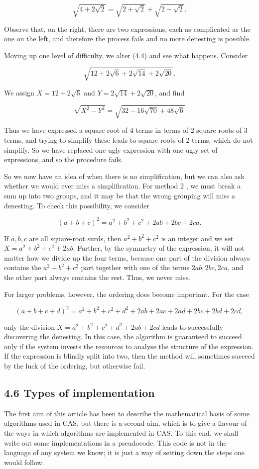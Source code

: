 \documentclass[11pt,letterpaper]{article}
\begin{document}
\[
\sqrt{4+2 \sqrt{2}}=\sqrt{2+\sqrt{2}}+\sqrt{2-\sqrt{2}} .
\]

Observe that, on the right, there are two expressions, each as complicated as the one on the left, and therefore the process fails and no more denesting is possible.

Moving up one level of difficulty, we alter (4.4) and see what happens. Consider

\[
\sqrt{12+2 \sqrt{6}+2 \sqrt{14}+2 \sqrt{20}} .
\]

We assign $X=12+2 \sqrt{6}$ and $Y=2 \sqrt{14}+2 \sqrt{20}$, and find

\[
\sqrt{X^{2}-Y^{2}}=\sqrt{32-16 \sqrt{70}+48 \sqrt{6}}
\]

Thus we have expressed a square root of 4 terms in terms of 2 square roots of 3 terms, and trying to simplify these leads to square roots of 2 terms, which do not simplify. So we have replaced one ugly expression with one ugly set of expressions, and so the procedure fails.

So we now have an idea of when there is no simplification, but we can also ask whether we would ever miss a simplification. For method 2 , we must break a sum up into two groups, and it may be that the wrong grouping will miss a denesting. To check this possibility, we consider

\[
(a+b+c)^{2}=a^{2}+b^{2}+c^{2}+2 a b+2 b c+2 c a .
\]

If $a, b, c$ are all square-root surds, then $a^{2}+b^{2}+c^{2}$ is an integer and we set $X=a^{2}+b^{2}+c^{2}+2 a b$. Further, by the symmetry of the expression, it will not matter how we divide up the four terms, because one part of the division always contains the $a^{2}+b^{2}+c^{2}$ part together with one of the terms $2 a b, 2 b c, 2 c a$, and the other part always contains the rest. Thus, we never miss.

For larger problems, however, the ordering does become important. For the case

\[
(a+b+c+d)^{2}=a^{2}+b^{2}+c^{2}+d^{2}+2 a b+2 a c+2 a d+2 b c+2 b d+2 c d,
\]

only the division $X=a^{2}+b^{2}+c^{2}+d^{2}+2 a b+2 c d$ leads to successfully discovering the denesting. In this case, the algorithm is guaranteed to succeed only if the system invests the resources to analyse the structure of the expression. If the expression is blindly split into two, then the method will sometimes succeed by the luck of the ordering, but otherwise fail.

\subsection*{4.6 Types of implementation}
The first aim of this article has been to describe the mathematical basis of some algorithms used in CAS, but there is a second aim, which is to give a flavour of the ways in which algorithms are implemented in CAS. To this end, we shall write out some implementations in a pseudocode. This code is not in the language of any system we know; it is just a way of setting down the steps one would follow.
\end{document}
